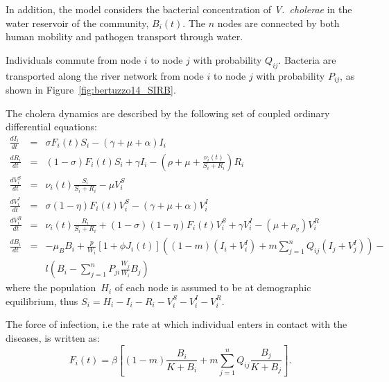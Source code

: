 In addition, the model considers the bacterial concentration of \textit{V.~cholerae} in the water reservoir of the community, $B_i(t)$. The $n$ nodes are connected by both human mobility and pathogen transport through water.

Individuals commute from node $i$ to node $j$ with probability $Q_{ij}$. Bacteria are transported along the river network from node $i$ to node $j$ with probability $P_{ij}$, as shown in Figure~\ref{fig:bertuzzo14_SIRB}.


The cholera dynamics are described by the following set of coupled ordinary differential equations:
\begin{eqnarray}
\frac{dI_i}{dt} &=& \sigma F_i(t) S_i - (\gamma + \mu + \alpha) I_i \label{eq:I2}\\
\frac{dR_i}{dt} &=& (1-\sigma) F_i(t) S_i + \gamma I_i - (\rho + \mu+\frac{\nu_i(t)}{S_i+R_i}) R_i \label{eq:R2}\\
\frac{dV^S_i}{dt} &=& \nu_i(t) \frac{S_i}{S_i+R_i}-\mu V^S_i \label{eq:VS2}\\
\frac{dV^I_i}{dt} &=& \sigma (1-\eta) F_i(t) V^S_i - (\gamma + \mu + \alpha) V^I_i \label{eq:VI2}\\
\frac{dV^R_i}{dt} &=& \nu_i(t) \frac{R_i}{S_i+R_i} + (1-\sigma) (1-\eta) F_i(t) V^S_i + \gamma V^I_i - (\mu+\rho_v) V^R_i \label{eq:VR2}\\
\frac{dB_i}{dt} &=& - \mu_B B_i +\frac{p}{W_i}\left[1 + \phi J_i(t) \right] \left((1-m)(I_i +V_i^I)+m \sum_{j=1}^n Q_{ij} (I_j +V_j^I)\right)- \nonumber \\
&& l \left( B_i - \sum_{j=1}^n P_{ji} \frac{W_j}{W_i} B_j \right)
\end{eqnarray}
%
where the population~$H_i$ of each node is assumed to be at demographic equilibrium, thus $S_i=H_i-I_i-R_i-V_i^S-V_i^I-V_i^R$.

The force of infection, i.e the rate at which individual enters in contact with the diseases, is written as:
%
\begin{equation}
F_i(t) = \beta \left[ (1 - m) \frac{B_i}{K + B_i} + m \sum_{j=1}^n Q_{ij} \frac{B_j}{K + B_j} \right].
\label{force}
\end{equation}

